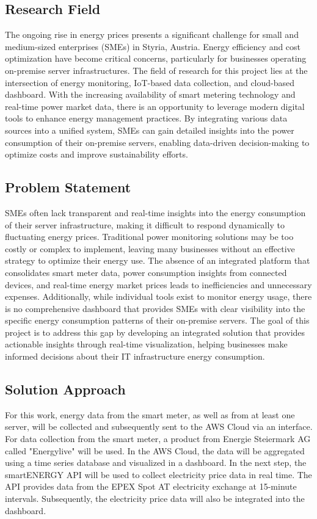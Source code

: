 \subsection{Research Field}
The ongoing rise in energy prices presents a significant challenge for small and medium-sized enterprises (SMEs) in Styria, Austria. 
Energy efficiency and cost optimization have become critical concerns, particularly for businesses operating on-premise server infrastructures. 
The field of research for this project lies at the intersection of energy monitoring, IoT-based data collection, and cloud-based dashboard. 
With the increasing availability of smart metering technology and real-time power market data, there is an opportunity to leverage modern digital tools to enhance energy management practices. 
By integrating various data sources into a unified system, SMEs can gain detailed insights into the power consumption of their on-premise servers, enabling data-driven decision-making to optimize costs and improve sustainability efforts.

\subsection{Problem Statement}

SMEs often lack transparent and real-time insights into the energy consumption of their server infrastructure, making it difficult to respond dynamically to fluctuating energy prices. 
Traditional power monitoring solutions may be too costly or complex to implement, leaving many businesses without an effective strategy to optimize their energy use. 
The absence of an integrated platform that consolidates smart meter data, power consumption insights from connected devices, and real-time energy market prices leads to inefficiencies and unnecessary expenses. 
Additionally, while individual tools exist to monitor energy usage, there is no comprehensive dashboard that provides SMEs with clear visibility into the specific energy consumption patterns of their on-premise servers. 
The goal of this project is to address this gap by developing an integrated solution that provides actionable insights through real-time visualization, helping businesses make informed decisions about their IT infrastructure energy consumption.

\subsection{Solution Approach}
For this work, energy data from the smart meter, as well as from at least one server, will be collected and subsequently sent to the AWS Cloud via an interface.
For data collection from the smart meter, a product from Energie Steiermark AG called "Energylive" will be used.
In the AWS Cloud, the data will be aggregated using a time series database and visualized in a dashboard.
In the next step, the smartENERGY API will be used to collect electricity price data in real time.
The API provides data from the EPEX Spot AT electricity exchange at 15-minute intervals.
Subsequently, the electricity price data will also be integrated into the dashboard.